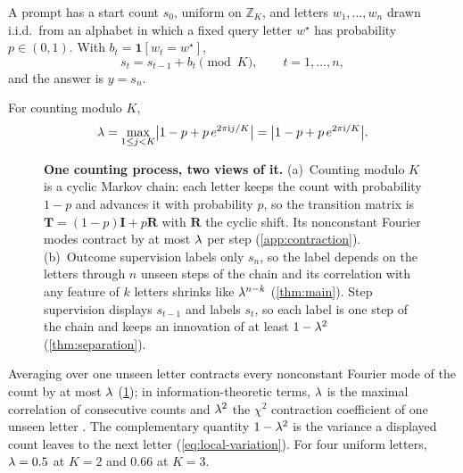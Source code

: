 \begin{definition}
\label{def:task}
A prompt has a start count $s_0$, uniform on $\mathbb Z_K$, and letters $w_1,\ldots,w_n$ drawn i.i.d.\ from an alphabet
in which a fixed query letter $w^\star$ has probability $p\in(0,1)$. With $b_t=\mathbf 1[w_t=w^\star]$,
\begin{equation}
 s_t=s_{t-1}+b_t\pmod K,\qquad t=1,\ldots,n,
 \label{eq:tracking}
\end{equation}
and the answer is $y=s_n$.
\end{definition}

\begin{definition}
\label{def:lambda}
For counting modulo $K$,
\begin{equation}
 \lambda=\max_{1\le j<K}\bigl|1-p+p\,e^{2\pi\mathrm ij/K}\bigr|=\bigl|1-p+p\,e^{2\pi\mathrm i/K}\bigr|.
 \label{eq:lambda}
\end{equation}
\end{definition}

\begin{figure}[t]
\centering
\resizebox{\linewidth}{!}{}
\caption{\textbf{One counting process, two views of it.}
(a)~Counting modulo $K$ is a cyclic Markov chain: each letter keeps the count with probability $1-p$ and advances it with probability
$p$, so the transition matrix is $\mathbf T=(1-p)\mathbf I+p\mathbf R$ with $\mathbf R$ the cyclic shift. Its nonconstant Fourier modes
contract by at most $\lambda$ per step (\cref{app:contraction}).
(b)~Outcome supervision labels only $s_n$, so the label depends on the letters through $n$ unseen steps of the chain and its
correlation with any feature of $k$ letters shrinks like $\lambda^{n-k}$ (\cref{thm:main}). Step supervision displays $s_{t-1}$ and labels $s_t$, so each label is one
step of the chain and keeps an innovation of at least $1-\lambda^2$ (\cref{thm:separation}).}
\label{fig:chain}
\end{figure}

Averaging over one unseen letter contracts every nonconstant Fourier mode of the count by at most $\lambda$ (\cref{fig:chain}); in information-theoretic terms,
$\lambda$ is the maximal correlation of consecutive counts and $\lambda^2$ the $\chi^2$ contraction coefficient of one
unseen letter \citep{witsenhausen1975sequences,raginsky2016strong}. The complementary quantity $1-\lambda^2$ is the
variance a displayed count leaves to the next letter (\cref{eq:local-variation}). For four uniform letters,
$\lambda=0.5$ at $K=2$ and $0.66$ at $K=3$.

